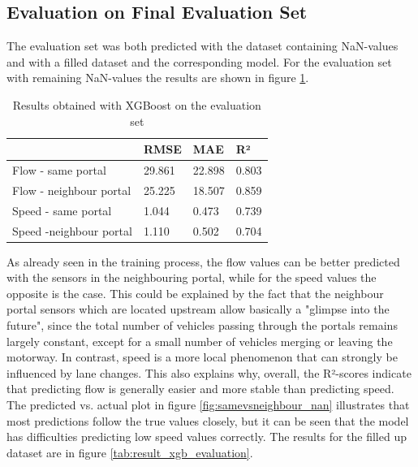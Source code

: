 	\subsection{Evaluation on Final Evaluation Set} 
	The evaluation set was both predicted with the dataset containing NaN-values and with a filled dataset and the corresponding model. 
	For the evaluation set with remaining NaN-values the results are shown in figure \ref{tab:result_xgb_evaluation_nan}.
	\begin{table}[H]
		\centering
		\caption{Results obtained with XGBoost on the evaluation set}
		\label{tab:result_xgb_evaluation_nan}
		\begin{tabular}{l|lll}
			& RMSE   & MAE    & R²    \\
			\hline
			Flow - same portal      & 29.861 & 22.898& 0.803\\
			Flow - neighbour portal  &25.225& 18.507& 0.859\\
			Speed - same portal     & 1.044& 0.473& 0.739\\
			Speed -neighbour portal & 1.110& 0.502& 0.704
		\end{tabular}
	\end{table}
	\noindent As already seen in the training process, the flow values can be better predicted with the sensors in the neighbouring portal, while for the speed values the opposite is the case. This could be explained by the fact that the neighbour portal sensors which are located upstream allow basically a "glimpse into the future", since the total number of vehicles passing through the portals remains largely constant, except for a small number of vehicles merging or leaving the motorway. In contrast, speed is a more local phenomenon that can strongly be influenced by lane changes. This also explains why, overall, the R²-scores indicate that predicting flow is generally easier and more stable than predicting speed.\newline 
	The predicted vs. actual plot in figure \ref{fig:samevsneighbour_nan} illustrates that most predictions follow the true values closely, but it can be seen that the model has difficulties predicting low speed values correctly. 
	The results for the filled up dataset are in figure \ref{tab:result_xgb_evaluation}.
